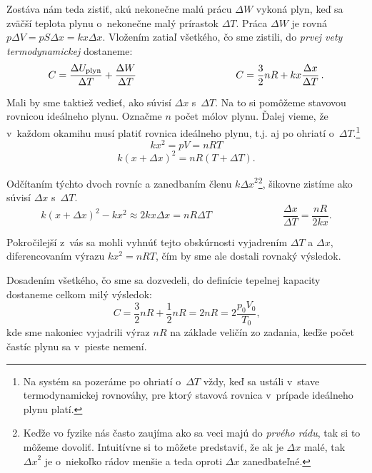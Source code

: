 Zostáva nám teda zistiť, akú nekonečne malú prácu $\Delta W$ vykoná plyn, keď sa zväčší teplota plynu o~nekonečne malý 
prírastok $\Delta T$. Práca $\Delta W$ je rovná $p\Delta V = pS\Delta x = kx\Delta x$. Vložením zatiaľ všetkého, čo sme zistili, do 
\emph{prvej vety termodynamickej} dostaneme:
$$C = \frac{\Delta U_{\text{plyn}}}{\Delta T} + \frac{\Delta W}{\Delta T} \hspace{3.5cm}
C = \frac{3}{2}nR + kx\frac{\Delta x}{\Delta T} \,\text{.}$$

Mali by sme taktiež vedieť, ako súvisí $\Delta x$ s~$\Delta T$. Na to si pomôžeme stavovou rovnicou ideálneho plynu. Označme $n$ počet 
mólov plynu. Ďalej vieme, že v~každom okamihu musí platiť rovnica ideálneho plynu, t.j. aj po ohriatí o~$\Delta T$.\footnote{Na 
systém sa pozeráme po ohriatí o~$\Delta T$ vždy, keď sa ustáli v~stave termodynamickej rovnováhy, pre ktorý stavová rovnica
v~prípade ideálneho plynu platí.}
$$kx^2  = pV = nRT $$
$$k{\left(x+\Delta x\right)}^2 = nR\left(T+\Delta T\right)\text{.}$$

Odčítaním týchto dvoch rovníc a zanedbaním členu $k{\Delta x}^2$\footnote{Keďže vo fyzike nás často zaujíma ako sa veci majú 
do \emph{prvého rádu}, tak si to môžeme dovoliť. Intuitívne si to môžete predstaviť, že ak je $\Delta x$ malé, tak ${\Delta x}^2$ 
je o~niekoľko rádov menšie
 a teda oproti $\Delta x$ zanedbateľné.}, šikovne zistíme ako súvisí $\Delta x$ s~$\Delta T$.
$$k{\left(x+\Delta x\right)}^2 - kx^2 \approx 2kx\Delta x = nR\Delta T \hspace{3cm}
\frac{\Delta x}{\Delta T} = \frac{nR}{2kx}\text{.}$$

Pokročilejší z~vás sa mohli vyhnúť tejto obskúrnosti vyjadrením $\Delta T$ a $\Delta x$, diferencovaním výrazu $kx^2 = nRT$,
čím by sme ale dostali rovnaký výsledok.

Dosadením všetkého, čo sme sa dozvedeli, do definície tepelnej kapacity dostaneme celkom milý výsledok:
$$
C = \frac{3}{2}nR + \frac{1}{2}nR = 2nR = 2\frac{p_0 V_0}{T_0} \text{,}
$$
kde sme nakoniec vyjadrili výraz $nR$ na základe veličín zo zadania, keďže počet častíc plynu sa v~pieste nemení.